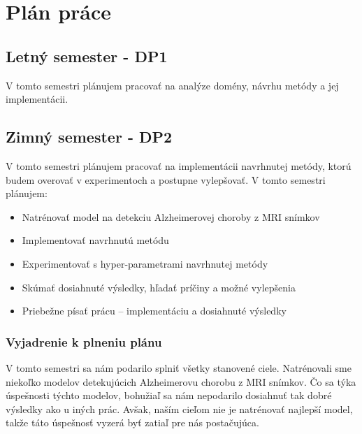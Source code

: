 \chapter{Plán práce \label{cha:plan}}

\setcounter{page}{1}

\section{Letný semester - DP1}

V tomto semestri plánujem pracovať na analýze domény, návrhu metódy a jej implementácii.

\section{Zimný semester - DP2}

    
    V tomto semestri plánujem pracovať na implementácii navrhnutej metódy, ktorú budem overovať v experimentoch a postupne vylepšovať. V tomto semestri plánujem:
    
    \begin{itemize}
        \item Natrénovať model na detekciu Alzheimerovej choroby z MRI snímkov
        \item Implementovať navrhnutú metódu
        \item Experimentovať s hyper-parametrami navrhnutej metódy
        \item Skúmať dosiahnuté výsledky, hľadať príčiny a možné vylepšenia
        \item Priebežne písať prácu -- implementáciu a dosiahnuté výsledky
    \end{itemize}

    \subsection{Vyjadrenie k plneniu plánu}

    V tomto semestri sa nám podarilo splniť všetky stanovené ciele. Natrénovali sme niekoľko modelov detekujúcich Alzheimerovu chorobu z MRI snímkov. Čo sa týka úspešnosti týchto modelov, bohužiaľ sa nám nepodarilo dosiahnuť tak dobré výsledky ako u iných prác. Avšak, naším cieľom nie je natrénovať najlepší model, takže táto úspešnosť vyzerá byť zatiaľ pre nás postačujúca. 

